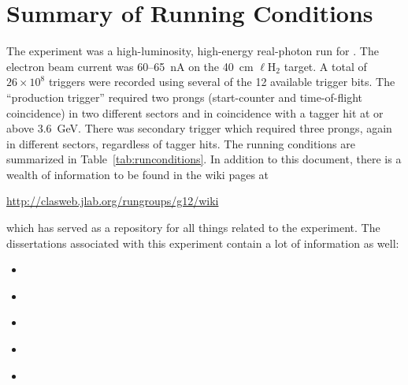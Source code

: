 \section{Summary of Running Conditions}

The  experiment was a high-luminosity, high-energy real-photon run for . The electron beam current was 60--65~nA on the 40~cm $\ell$H$_2$ target. A total of $26\times 10^8$ triggers were recorded using several of the 12 available trigger bits. The ``production trigger'' required two prongs (start-counter and time-of-flight coincidence) in two different sectors and in coincidence with a tagger hit at or above 3.6~GeV. There was secondary trigger which required three prongs, again in different sectors, regardless of tagger hits. The running conditions are summarized in Table~\ref{tab:runconditions}. In addition to this document, there is a wealth of information to be found in the wiki pages at
\begin{center}
    \url{http://clasweb.jlab.org/rungroups/g12/wiki}
\end{center}
which has served as a repository for all things related to the  experiment. The dissertations associated with this experiment contain a lot of information as well:

\begin{itemize}
    \item \href{http://www.jlab.org/Hall-B/general/thesis/Goetz_thesis.pdf}{}
    \item \href{http://www.jlab.org/Hall-B/general/thesis/Bookwalter_thesis.pdf}{}
    \item \href{http://www.jlab.org/Hall-B/general/thesis/Schott_thesis.pdf}{}
    \item \href{http://www.jlab.org/Hall-B/general/thesis/MSaini_thesis.pdf}{}
    \item \href{http://www.jlab.org/Hall-B/general/thesis/Bono_thesis.pdf}{}
\end{itemize}




